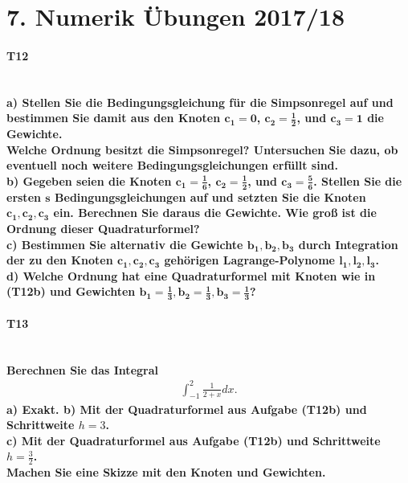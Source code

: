 \documentclass[10pt,a4paper]{article}
\begin{document}
	\section*{7. Numerik Übungen 2017/18}
	\paragraph{T12}\mbox{}\\
	\textbf{%
		a) Stellen Sie die Bedingungsgleichung für die Simpsonregel auf und bestimmen Sie damit aus den Knoten $\pmb{c_1=0}$, $\pmb{c_2=\frac{1}{2}}$, und $\pmb{c_3=1}$ die Gewichte.\\
        Welche Ordnung besitzt die Simpsonregel? Untersuchen Sie dazu, ob eventuell noch weitere Bedingungsgleichungen erfüllt sind.
	}\\
	
    
    
    \textbf{%
        b) Gegeben seien die Knoten $\pmb{c_1=\frac{1}{6}}$, $\pmb{c_2=\frac{1}{2}}$, und $\pmb{c_3=\frac{5}{6}}$. Stellen Sie die ersten $\pmb{s}$ Bedingungsgleichungen auf und setzten Sie die Knoten $\pmb{c_1, c_2, c_3}$ ein. Berechnen Sie daraus die Gewichte. Wie groß ist die Ordnung dieser Quadraturformel?
    }\\


    \textbf{%
        c) Bestimmen Sie alternativ die Gewichte $\pmb{b_1, b_2, b_3}$ durch Integration der zu den Knoten $\pmb{c_1, c_2, c_3}$ gehörigen Lagrange-Polynome $\pmb{l_1, l_2, l_3}$.
    }\\


    \textbf{%
        d) Welche Ordnung hat eine Quadraturformel mit Knoten wie in (T12b) und Gewichten $\pmb{b_1=\frac{1}{3}, b_2=\frac{1}{3}, b_3=\frac{1}{3}}$?
    }\\



    \pagebreak
    \paragraph{T13}\mbox{}\\
    \textbf{%
        Berechnen Sie das Integral
        \begin{align*}
            \int_{-1}^{2}\frac{1}{2+x}dx.
        \end{align*}
        a) Exakt.
        b) Mit der Quadraturformel aus Aufgabe (T12b) und Schrittweite $h=3$. \\
        c) Mit der Quadraturformel aus Aufgabe (T12b) und Schrittweite $h=\frac{3}{2}$. \\
        Machen Sie eine Skizze mit den Knoten und Gewichten.
    }\\
	
\end{document}
